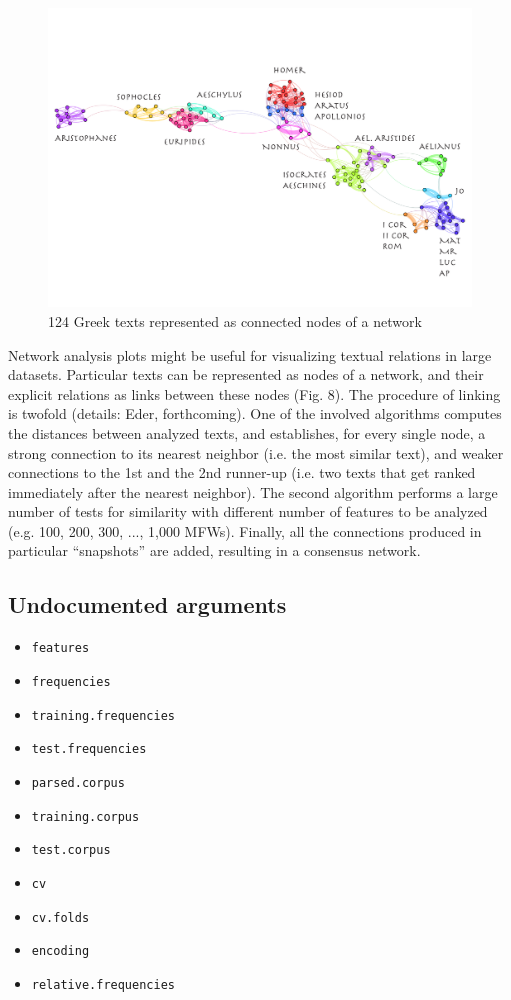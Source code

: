 \documentclass[11pt,a4paper]{article}
\def\code#1{{\tt #1}}
\begin{document}
\begin{figure}
  \centering
  \includegraphics[width=0.8\linewidth]{img/124_Greek_texts.png}
  \caption{124 Greek texts represented as connected nodes of a network}
\end{figure}

Network analysis plots might be useful for visualizing textual relations 
in large datasets. Particular texts can be represented as nodes of a network, 
and their explicit relations as links between these nodes (Fig. 8). 
The procedure of linking is twofold (details: Eder, forthcoming). 
One of the involved algorithms computes the distances between analyzed texts, 
and establishes, for every single node, a strong connection to its nearest 
neighbor (i.e. the most similar text), and weaker connections to the 1st and 
the 2nd runner-up (i.e. two texts that get ranked immediately after the 
nearest neighbor). The second algorithm performs a large number of tests 
for similarity with different number of features to be analyzed 
(e.g. 100, 200, 300, ..., 1,000 MFWs). Finally, all the connections produced 
in particular “snapshots” are added, resulting in a consensus network. 





\subsection{Undocumented arguments}

\begin{itemize}

\item \code{features}
\item \code{frequencies}
\item \code{training.frequencies}
\item \code{test.frequencies}
\item \code{parsed.corpus}
\item \code{training.corpus}
\item \code{test.corpus}
\item \code{cv}
\item \code{cv.folds}
\item \code{encoding}
\item \code{relative.frequencies}
\end{itemize}
\end{document}

